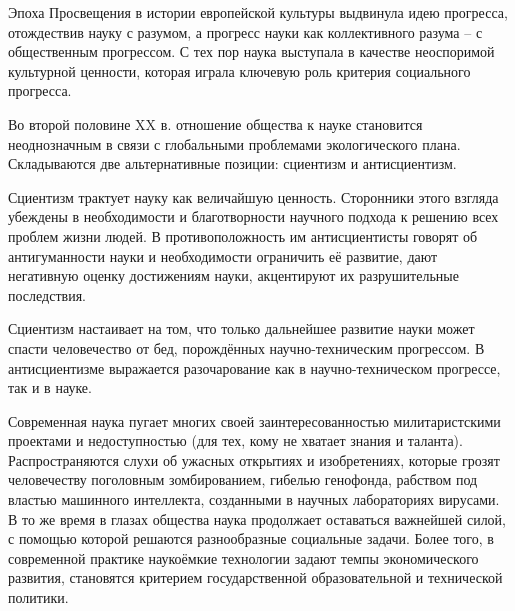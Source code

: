 \documentclass[exam_answers.tex]{subfiles}
\begin{document}
\renewcommand{\baselinestretch}{0.75}

Эпоха Просвещения в истории европейской культуры выдвинула идею прогресса, отождествив науку с разумом, а прогресс науки как коллективного разума – с общественным прогрессом.
С тех пор наука выступала в качестве неоспоримой культурной ценности, которая играла ключевую роль критерия социального прогресса.

Во второй половине XX в. отношение общества к науке становится неоднозначным в связи с глобальными проблемами экологического плана.
Складываются две альтернативные позиции: сциентизм и антисциентизм.

Сциентизм трактует науку как величайшую ценность.
Сторонники этого взгляда убеждены в необходимости и благотворности научного подхода к решению всех проблем жизни людей.
В противоположность им антисциентисты говорят об антигуманности науки и необходимости ограничить её развитие, дают негативную оценку достижениям науки, акцентируют их разрушительные последствия.

Сциентизм настаивает на том, что только дальнейшее развитие науки может спасти человечество от бед, порождённых научно-техническим прогрессом.
В антисциентизме выражается разочарование как в научно-техническом прогрессе, так и в науке.

Современная наука пугает многих своей заинтересованностью милитаристскими проектами и недоступностью (для тех, кому не хватает знания и таланта).
Распространяются слухи об ужасных открытиях и изобретениях, которые грозят человечеству поголовным зомбированием, гибелью генофонда, рабством под властью машинного интеллекта, созданными в научных лабораториях вирусами.
В то же время в глазах общества наука продолжает оставаться важнейшей силой, с помощью которой решаются разнообразные социальные задачи.
Более того, в современной практике наукоёмкие технологии задают темпы экономического развития, становятся критерием государственной образовательной и технической политики.
\end{document}
